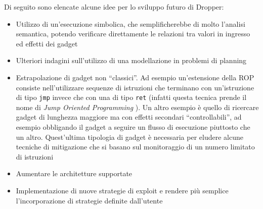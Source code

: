 Di seguito sono elencate alcune idee per lo sviluppo futuro di Dropper:

\begin{itemize}

  \item Utilizzo di un'esecuzione simbolica, che semplificherebbe di
    molto l'analisi semantica, potendo verificare direttamente le
    relazioni tra valori in ingresso ed effetti dei gadget

  \item Ulteriori indagini sull'utilizzo di una modellazione in
    problemi di planning

  \item Estrapolazione di gadget non ``classici''. Ad esempio
        un'estensione della ROP consiste nell'utilizzare sequenze di
        istruzioni che terminano con un'istruzione di tipo
        \lstinline{jmp} invece che con una di tipo \lstinline{ret}
        (infatti questa tecnica prende il nome di \emph{Jump Oriented
          Programming} \cite{Checkoway-10}).
        Un altro esempio è quello di ricercare gadget di lunghezza maggiore ma
        con effetti secondari ``controllabili'', ad esempio obbligando il
        gadget a seguire un flusso di esecuzione piuttosto che
        un altro. Quest'ultima tipologia di gadget è necessaria per eludere
        alcune tecniche di mitigazione che si basano sul monitoraggio di un
        numero limitato di istruzioni

      \item Aumentare le architetture supportate

      \item Implementazione di nuove strategie di exploit e rendere
        più semplice l'incorporazione di strategie definite
        dall'utente

\end{itemize}

